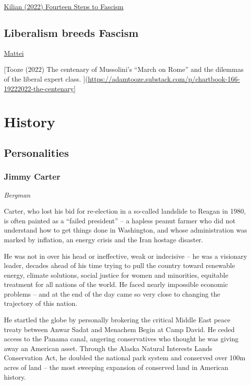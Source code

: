 \documentclass[
]{book}
\begin{document}
\href{https://thetyee.ca/Opinion/2018/07/30/Fourteen-Steps-To-Fascism/}{Kilian (2022) Fourteen Steps to Fascism}

\hypertarget{liberalism-breeds-fascism}{%
\section{Liberalism breeds Fascism}\label{liberalism-breeds-fascism}}

\href{https://jacobin.com/2022/10/mussolini-fascism-liberalism-austerity}{Mattei}

{[}Tooze (2022) The centenary of Mussolini's ``March on Rome'' and the dilemmas of the liberal expert class. {]}(\url{https://adamtooze.substack.com/p/chartbook-166-19222022-the-centenary}{]}

\hypertarget{history}{%
\chapter{History}\label{history}}

\hypertarget{personalities}{%
\section{Personalities}\label{personalities}}

\hypertarget{jimmy-carter}{%
\subsection{Jimmy Carter}\label{jimmy-carter}}

\emph{Bergman}

Carter, who lost his bid for re-election in a so-called landslide to Reagan in 1980, is often painted as a ``failed president'' -- a hapless peanut farmer who did not understand how to get things done in Washington, and whose administration was marked by inflation, an energy crisis and the Iran hostage disaster.

He was not in over his head or ineffective, weak or indecisive -- he was a visionary leader, decades ahead of his time trying to pull the country toward renewable energy, climate solutions, social justice for women and minorities, equitable treatment for all nations of the world. He faced nearly impossible economic problems -- and at the end of the day came so very close to changing the trajectory of this nation.

He startled the globe by personally brokering the critical Middle East peace treaty between Anwar Sadat and Menachem Begin at Camp David. He ceded access to the Panama canal, angering conservatives who thought he was giving away an American asset. Through the Alaska Natural Interests Lands Conservation Act, he doubled the national park system and conserved over 100m acres of land -- the most sweeping expansion of conserved land in American history.
\end{document}
